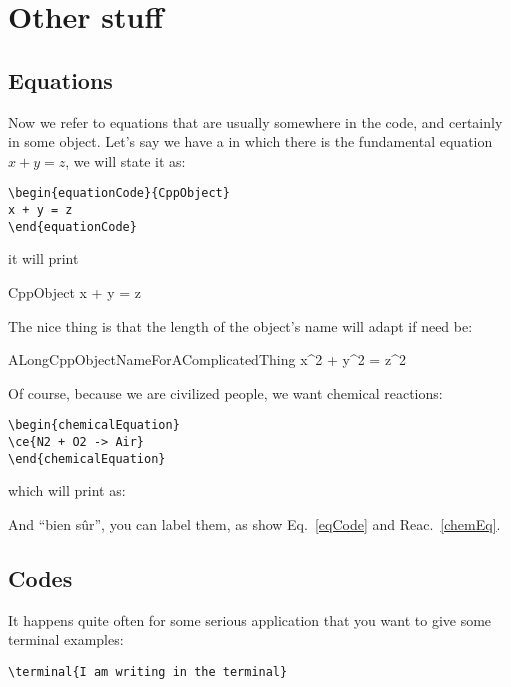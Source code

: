 \documentclass{documentation}
\begin{document}
\chapter{Other stuff}

\section{Equations}

Now we refer to equations that are usually somewhere in the
code, and certainly in some object. Let's say we have a
in which there is the fundamental equation
$x + y = z$, we will state it as:
\begin{verbatim}
\begin{equationCode}{CppObject}
x + y = z
\end{equationCode}
\end{verbatim}
it will print
\begin{equationCode}{CppObject}
x + y = z
\label{eqCode}
\end{equationCode}
The nice thing is that the length of the object's name will adapt
if need be:
\begin{equationCode}{ALongCppObjectNameForAComplicatedThing}
x^2 + y^2 = z^2
\end{equationCode}

Of course, because we are civilized people, we want chemical
reactions:
\begin{verbatim}
\begin{chemicalEquation}
\ce{N2 + O2 -> Air}
\end{chemicalEquation}
\end{verbatim}
which will print as:
\begin{chemicalEquation}
\label{chemEq}
\end{chemicalEquation}

And ``bien s\^ur'', you can label them, as show Eq.~\ref{eqCode} and
Reac.~\ref{chemEq}.

\section{Codes}

It happens quite often for some serious application that
you want to give some terminal examples:
\begin{verbatim}
\terminal{I am writing in the terminal}
\end{verbatim}

\end{document}
